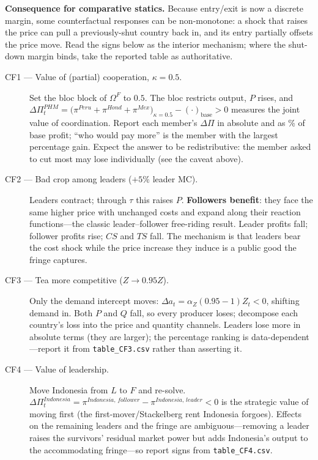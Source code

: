 \documentclass[11pt]{article}
\newcommand{\1}{\mathbf{1}}
\newcommand{\Om}{\Omega}
\newcommand{\OmF}{\Om^{F}}
\begin{document}
\medskip\noindent\textbf{Consequence for comparative statics.} Because entry/exit
is now a discrete margin, some counterfactual responses can be non-monotone: a
shock that raises the price can pull a previously-shut country back in, and its
entry partially offsets the price move. Read the signs below as the interior
mechanism; where the shut-down margin binds, take the reported table as
authoritative.

\begin{description}
\item[CF1 --- Value of (partial) cooperation, $\kappa=0.5$.]
Set the bloc block of $\OmF$ to $0.5$. The bloc restricts output, $P$ rises, and
$\Delta\Pi^{PHM}_t=\big(\pi^{Peru}+\pi^{Hond}+\pi^{Mex}\big)_{\kappa=0.5}-(\cdot)_{\text{base}}>0$
measures the joint value of coordination. Report each member's $\Delta\Pi$ in
absolute and as \% of base profit; ``who would pay more'' is the member with the
largest percentage gain. Expect the answer to be redistributive: the member asked
to cut most may lose individually (see the caveat above).

\item[CF2 --- Bad crop among leaders ($+5\%$ leader MC).]
Leaders contract; through $\tau$ this raises $P$. \textbf{Followers benefit}: they
face the same higher price with unchanged costs and expand along their reaction
functions---the classic leader--follower free-riding result. Leader profits fall;
follower profits rise; $CS$ and $TS$ fall. The mechanism is that leaders bear the
cost shock while the price increase they induce is a public good the fringe
captures.

\item[CF3 --- Tea more competitive ($Z\to0.95Z$).]
Only the demand intercept moves: $\Delta a_t=\alpha_Z(0.95-1)Z_t<0$, shifting
demand in. Both $P$ and $Q$ fall, so every producer loses; decompose each
country's loss into the price and quantity channels. Leaders lose more in absolute
terms (they are larger); the percentage ranking is data-dependent---report it from
\texttt{table\_CF3.csv} rather than asserting it.

\item[CF4 --- Value of leadership.]
Move Indonesia from $L$ to $F$ and re-solve.
$\Delta\Pi^{Indonesia}_t=\pi^{Indonesia,\,follower}-\pi^{Indonesia,\,leader}<0$
is the strategic value of moving first (the first-mover/Stackelberg rent Indonesia
forgoes). Effects on the remaining leaders and the fringe are ambiguous---removing
a leader raises the survivors' residual market power but adds Indonesia's output to
the accommodating fringe---so report signs from \texttt{table\_CF4.csv}.
\end{description}
\end{document}
